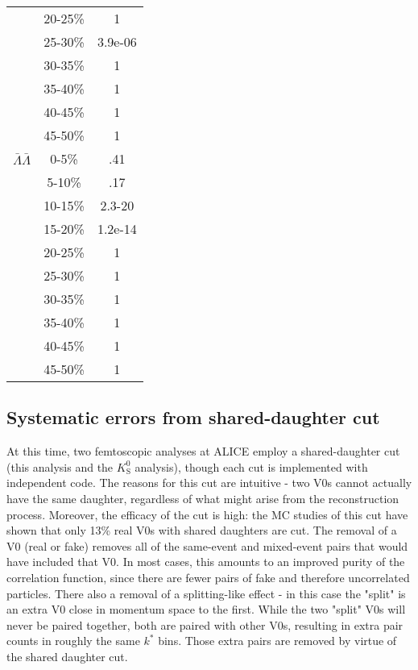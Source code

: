 \begin{table}
\begin{minipage}{18pc}
\begin{center}
\begin{tabular}{| c | c | c |}
   & 20-25\% & 1 \\
   & 25-30\% & 3.9e-06 \\
   & 30-35\% & 1 \\
   & 35-40\% & 1 \\
   & 40-45\% & 1 \\
   & 45-50\% & 1 \\
   \hline
  $\bar{\Lambda}\bar{\Lambda}$ &  0-5\% & .41 \\
   & 5-10\% & .17 \\
   & 10-15\% & 2.3-20 \\
   & 15-20\% & 1.2e-14 \\
   & 20-25\% & 1 \\
   & 25-30\% & 1 \\
   & 30-35\% & 1 \\
   & 35-40\% & 1 \\
   & 40-45\% & 1 \\
   & 45-50\% & 1 \\
   \hline 
\end{tabular}
\end{center}
\end{minipage}
\end{table}

\subsection{Systematic errors from shared-daughter cut}

At this time, two femtoscopic analyses at ALICE employ a shared-daughter cut (this analysis and the $K^0_\mathrm{S}$ analysis), though each cut is implemented with independent code.  The reasons for this cut are intuitive - two V0s cannot actually have the same daughter, regardless of what might arise from the reconstruction process.  Moreover, the efficacy of the cut is high: the MC studies of this cut have shown that only 13\% real V0s with shared daughters are cut.  The removal of a V0 (real or fake) removes all of the same-event and mixed-event pairs that would have included that V0.  In most cases, this amounts to an improved purity of the correlation function, since there are fewer pairs of fake and therefore uncorrelated particles.  There also a removal of a splitting-like effect - in this case the "split" is an extra V0 close in momentum space to the first.  While the two "split" V0s will never be paired together, both are paired with other V0s, resulting in extra pair counts in roughly the same $k^*$ bins.  Those extra pairs are removed by virtue of the shared daughter cut.

